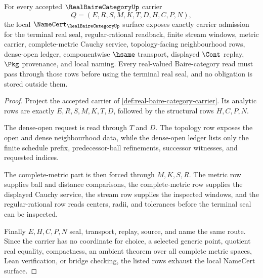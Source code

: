\begin{theorem}
\label{thm:real-baire-category-namecert-obligations}
For every accepted $\RealBaireCategoryUp$ carrier
$$
Q=(E,R,S,M,K,T,D,H,C,P,N),
$$
the local $\NameCert_{\RealBaireCategoryUp}$ surface exposes exactly carrier admission for the terminal real seal, regular-rational readback, finite stream windows, metric carrier, complete-metric Cauchy service, topology-facing neighbourhood rows, dense-open ledger, componentwise $\hsame$ transport, displayed $\Cont$ replay, $\Pkg$ provenance, and local naming. Every real-valued Baire-category read must pass through those rows before using the terminal real seal, and no obligation is stored outside them.
\end{theorem}
\begin{proof}
Project the accepted carrier of \autoref{def:real-baire-category-carrier}. Its analytic rows are exactly $E,R,S,M,K,T,D$, followed by the structural rows $H,C,P,N$.

The dense-open request is read through $T$ and $D$. The topology row exposes the open and dense neighbourhood data, while the dense-open ledger lists only the finite schedule prefix, predecessor-ball refinements, successor witnesses, and requested indices.

The complete-metric part is then forced through $M,K,S,R$. The metric row supplies ball and distance comparisons, the complete-metric row supplies the displayed Cauchy service, the stream row supplies the inspected windows, and the regular-rational row reads centers, radii, and tolerances before the terminal seal can be inspected.

Finally $E,H,C,P,N$ seal, transport, replay, source, and name the same route. Since the carrier has no coordinate for choice, a selected generic point, quotient real equality, compactness, an ambient theorem over all complete metric spaces, Lean verification, or bridge checking, the listed rows exhaust the local NameCert surface.
\end{proof}

